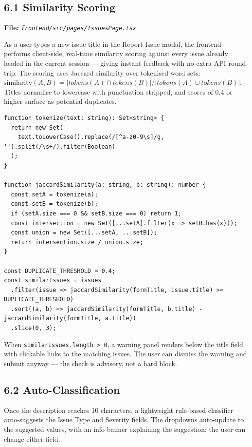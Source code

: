 \documentclass[11pt]{article}
\newcommand{\filelabel}[1]{\textbf{File:} \textit{\texttt{#1}}\par\vspace{2pt}}
\begin{document}
\subsection{6.1 Similarity Scoring}
\filelabel{frontend/src/pages/IssuesPage.tsx}

As a user types a new issue title in the Report Issue modal, the frontend performs client-side, real-time similarity scoring against every issue already loaded in the current session --- giving instant feedback with no extra API round-trip. The scoring uses Jaccard similarity over tokenised word sets: $\text{similarity}(A, B) = |tokens(A) \cap tokens(B)| / |tokens(A) \cup tokens(B)|$. Titles normalise to lowercase with punctuation stripped, and scores of 0.4 or higher surface as potential duplicates.

\begin{lstlisting}
function tokenize(text: string): Set<string> {
  return new Set(
    text.toLowerCase().replace(/[^a-z0-9\s]/g, '').split(/\s+/).filter(Boolean)
  );
}

function jaccardSimilarity(a: string, b: string): number {
  const setA = tokenize(a);
  const setB = tokenize(b);
  if (setA.size === 0 && setB.size === 0) return 1;
  const intersection = new Set([...setA].filter(x => setB.has(x)));
  const union = new Set([...setA, ...setB]);
  return intersection.size / union.size;
}

const DUPLICATE_THRESHOLD = 0.4;
const similarIssues = issues
  .filter(issue => jaccardSimilarity(formTitle, issue.title) >= DUPLICATE_THRESHOLD)
  .sort((a, b) => jaccardSimilarity(formTitle, b.title) - jaccardSimilarity(formTitle, a.title))
  .slice(0, 3);
\end{lstlisting}

When \texttt{similarIssues.length > 0}, a warning panel renders below the title field with clickable links to the matching issues. The user can dismiss the warning and submit anyway --- the check is advisory, not a hard block.

\subsection{6.2 Auto-Classification}

Once the description reaches 10 characters, a lightweight rule-based classifier auto-suggests the Issue Type and Severity fields. The dropdowns auto-update to the suggested values, with an info banner explaining the suggestion; the user can change either field.
\end{document}
